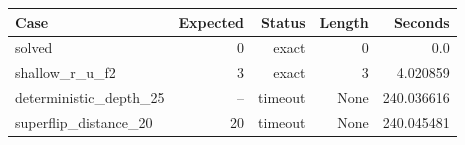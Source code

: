 {\small
\begin{tabular}{lrrrr}
\hline
Case & Expected & Status & Length & Seconds \\
\hline
solved & 0 & exact & 0 & 0.0 \\
shallow\_r\_u\_f2 & 3 & exact & 3 & 4.020859 \\
deterministic\_depth\_25 & -- & timeout & None & 240.036616 \\
superflip\_distance\_20 & 20 & timeout & None & 240.045481 \\
\hline
\end{tabular}
}
